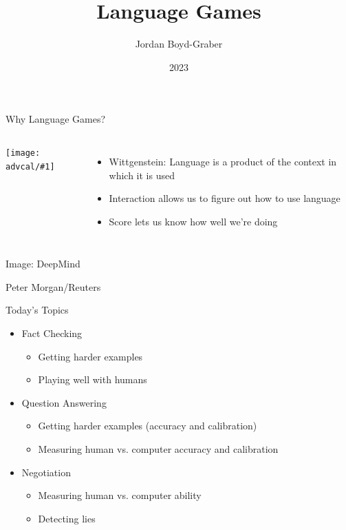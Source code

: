 \documentclass[compress]{beamer}
\title[]{Language Games}
\author{ Jordan Boyd-Graber}
\date{2023}
\institute[] %
{University of Maryland}
\newcommand{\fsi}[2]{
\begin{frame}[plain]
\vspace*{-1pt}
\makebox[\linewidth]{\texttt{[image: \#1]}}
\begin{center}
#2
\end{center}
\end{frame}
}
\newcommand{\gfxa}[2]{
	\begin{center}
		\texttt{[image: advcal/\#1]}
	\end{center}
}
\begin{document}
\frame{
\titlepage
\tiny
}


\begin{frame}{Why Language Games?}


  \begin{columns}


    \gfxa{wittgenstein}{.8}




    \begin{itemize}

      \item Wittgenstein: Language is a product of the context in which it is
        used
      \item Interaction allows us to figure out how to use language
        \item Score lets us know how well we're doing
    \end{itemize}


    \end{columns}

  

\end{frame}

\fsi{qb/starcraft}{Image: DeepMind}
\fsi{qb/DeepBlue}{Peter Morgan/Reuters}

\begin{frame}{Today's Topics}
	\begin{itemize}
	\item Fact Checking
	\begin{itemize}
		\item Getting harder examples
		\item Playing well with humans
	\end{itemize}
	\item Question Answering
	\begin{itemize}
		\item Getting harder examples (accuracy and calibration)
		\item Measuring human vs. computer accuracy and calibration
	\end{itemize}
	\item Negotiation
	\begin{itemize}
		\item Measuring human vs. computer ability
		\item Detecting lies
	\end{itemize}
	\end{itemize}
\end{frame}
\end{document}
